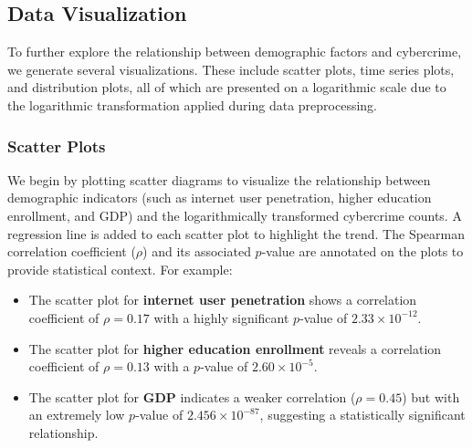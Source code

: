 \subsection{Data Visualization}\label{subsec:data-visualization} %
To further explore the relationship between demographic factors and cybercrime,
we generate several visualizations.
These include scatter plots, time series plots, and distribution plots,
all of which are presented on a logarithmic scale
due to the logarithmic transformation applied during data preprocessing.

    \subsubsection{Scatter Plots} %
        We begin by plotting scatter diagrams to visualize the relationship between demographic indicators
        (such as internet user penetration, higher education enrollment, and GDP) and the logarithmically transformed cybercrime counts.
        A regression line is added to each scatter plot to highlight the trend.
        The Spearman correlation coefficient (\(\rho\)) and its associated \(p\)-value are annotated on the plots to provide statistical context.
        For example:
        \begin{itemize}
            \item The scatter plot for \textbf{internet user penetration}
                shows a correlation coefficient of \(\rho = 0.17\) with a highly significant \(p\)-value of \(2.33 \times 10^{-12}\).
            \item The scatter plot for \textbf{higher education enrollment}
                reveals a correlation coefficient of \(\rho = 0.13\) with a \(p\)-value of \(2.60 \times 10^{-5}\).
            \item The scatter plot for \textbf{GDP}
                indicates a weaker correlation (\(\rho = 0.45\)) but with an extremely low \(p\)-value of \(2.456 \times 10^{-87}\),
                suggesting a statistically significant relationship.
        \end{itemize}

